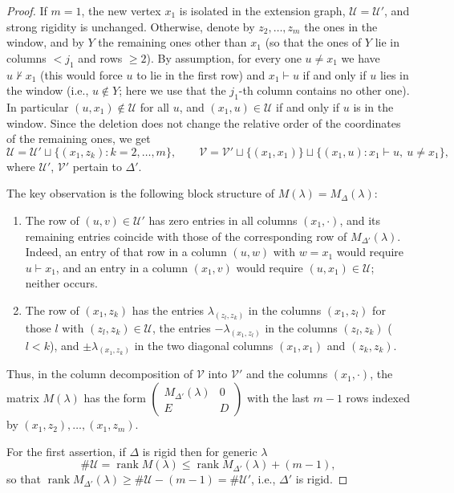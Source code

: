 \documentclass[12pt]{article}
\newcommand{\U}{\mathcal{U}}
\newcommand{\V}{\mathcal{V}}
\newcommand{\rk}{\operatorname{rank}}
\newcommand{\IM}{\Delta}
\newcommand{\homr}{\vdash}
\begin{document}
\begin{proof}
If $m=1$, the new vertex $x_1$ is isolated in the extension graph, $\U=\U'$, and strong rigidity is
unchanged.
Otherwise, denote by $z_2,\dots,z_m$ the ones in the window, and by $Y$ the remaining ones other than $x_1$
(so that the ones of $Y$ lie in columns $<j_1$ and rows $\ge2$).
By assumption, for every one $u\ne x_1$ we have $u\not\homr x_1$ (this would force $u$ to lie in the first row)
and $x_1\homr u$ if and only if $u$ lies in the window (i.e., $u\not\in Y$; here we use that the $j_1$-th column
contains no other one). In particular $(u,x_1)\notin\U$ for all $u$, and $(x_1,u)\in\U$ if and only if $u$ is in the
window. Since the deletion does not change the relative order of the coordinates of the remaining ones, we get
\[
\U=\U'\sqcup\{(x_1,z_k):k=2,\dots,m\},\qquad
\V=\V'\sqcup\{(x_1,x_1)\}\sqcup\{(x_1,u):x_1\homr u,\ u\ne x_1\},
\]
where $\U'$, $\V'$ pertain to $\IM'$.

The key observation is the following block structure of $M(\lambda)=M_\IM(\lambda)$:
\begin{enumerate}
\item \label{part: blockold} The row of $(u,v)\in\U'$ has zero entries in all columns $(x_1,\cdot)$, and its remaining entries coincide
with those of the corresponding row of $M_{\IM'}(\lambda)$. Indeed, an entry of that row in a column $(u,w)$ with
$w=x_1$ would require $u\homr x_1$, and an entry in a column $(x_1,v)$ would require $(u,x_1)\in\U$; neither occurs.
\item \label{part: blocknew} The row of $(x_1,z_k)$ has the entries $\lambda_{(z_l,z_k)}$ in the columns $(x_1,z_l)$ for those $l$
with $(z_l,z_k)\in\U$, the entries $-\lambda_{(x_1,z_l)}$ in the columns $(z_l,z_k)$ ($l<k$),
and $\pm\lambda_{(x_1,z_k)}$ in the two diagonal columns $(x_1,x_1)$ and $(z_k,z_k)$.
\end{enumerate}
Thus, in the column decomposition of $\V$ into $\V'$ and the columns $(x_1,\cdot)$, the matrix $M(\lambda)$ has the form
$\begin{pmatrix}M_{\IM'}(\lambda)&0\\ E&D\end{pmatrix}$
with the last $m-1$ rows indexed by $(x_1,z_2),\dots,(x_1,z_m)$.

For the first assertion, if $\IM$ is rigid then for generic $\lambda$
\[
\#\U=\rk M(\lambda)\le\rk M_{\IM'}(\lambda)+(m-1),
\]
so that $\rk M_{\IM'}(\lambda)\ge\#\U-(m-1)=\#\U'$, i.e., $\IM'$ is rigid.


\end{proof}
\end{document}
